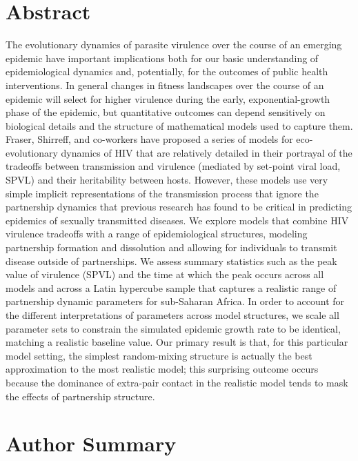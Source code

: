 \documentclass[10pt,letterpaper]{article}
\begin{document}
\section*{Abstract}
The evolutionary dynamics of parasite virulence over the
  course of an emerging epidemic have important implications both for
  our basic understanding of epidemiological dynamics and,
  potentially, for the outcomes of public health interventions. In
  general changes in fitness landscapes over the course of an epidemic
  will select for higher virulence during the early,
  exponential-growth phase of the epidemic, but quantitative outcomes
  can depend sensitively on biological details and the structure of
  mathematical models used to capture them.  Fraser, Shirreff, and
  co-workers have proposed a series of models for eco-evolutionary
  dynamics of HIV that are relatively detailed in their portrayal of
  the tradeoffs between transmission and virulence (mediated by
  set-point viral load, SPVL) and their heritability between
  hosts. However, these models use very simple implicit
  representations of the transmission process that ignore the
  partnership dynamics that previous research has found to be critical
  in predicting epidemics of sexually transmitted diseases.  We
  explore models that combine HIV virulence tradeoffs with a range of
  epidemiological structures, modeling partnership formation and
  dissolution and allowing for individuals to transmit disease outside
  of partnerships. We assess summary statistics such as the peak value
  of virulence (SPVL) and the time at which the peak occurs across all
  models and across a Latin hypercube sample that captures a realistic
  range of partnership dynamic parameters for sub-Saharan Africa. In
  order to account for the different interpretations of parameters
  across model structures, we scale all parameter sets to constrain
  the simulated epidemic growth rate to be identical, matching a
  realistic baseline value. Our primary result is that, for this
  particular model setting, the simplest random-mixing structure is
  actually the best approximation to the most realistic model; this
  surprising outcome occurs because the dominance of extra-pair
  contact in the realistic model tends to mask the effects of
  partnership structure.

\section*{Author Summary}
\end{document}

